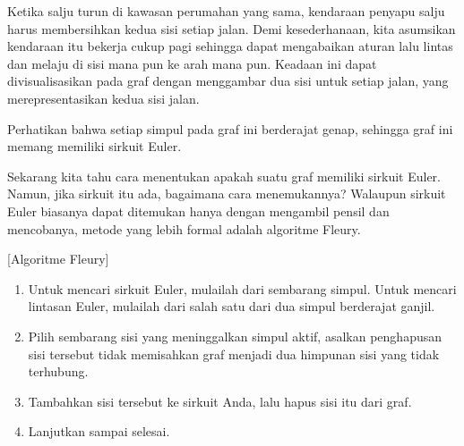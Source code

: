 \begin{example}{}%
Ketika salju turun di kawasan perumahan yang sama, kendaraan penyapu salju harus membersihkan kedua sisi setiap jalan.  Demi kesederhanaan, kita asumsikan kendaraan itu bekerja cukup pagi sehingga dapat mengabaikan aturan lalu lintas dan melaju di sisi mana pun ke arah mana pun.  Keadaan ini dapat divisualisasikan pada graf dengan menggambar dua sisi untuk setiap jalan, yang merepresentasikan kedua sisi jalan.\\


Perhatikan bahwa setiap simpul pada graf ini berderajat genap, sehingga graf ini memang memiliki sirkuit Euler.  
\end{example}

Sekarang kita tahu cara menentukan apakah suatu graf memiliki sirkuit Euler. Namun, jika sirkuit itu ada, bagaimana cara menemukannya?  Walaupun sirkuit Euler biasanya dapat ditemukan hanya dengan mengambil pensil dan mencobanya, metode yang lebih formal adalah algoritme Fleury.

\begin{algorithm}{}{}[Algoritme Fleury]
\hspace{3in}
\begin{enumerate}
\item	Untuk mencari sirkuit Euler, mulailah dari sembarang simpul.  Untuk mencari lintasan Euler, mulailah dari salah satu dari dua simpul berderajat ganjil.
\item	Pilih sembarang sisi yang meninggalkan simpul aktif, asalkan penghapusan sisi tersebut tidak memisahkan graf menjadi dua himpunan sisi yang tidak terhubung.
\item	Tambahkan sisi tersebut ke sirkuit Anda, lalu hapus sisi itu dari graf.
\item	Lanjutkan sampai selesai.
\end{enumerate}
\end{algorithm}

